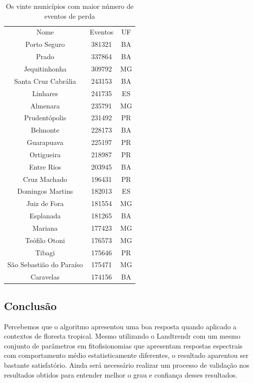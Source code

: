 \begin{table}[H]
    \centering
    \begin{tabular}{|c | c | c|}
    \hline
                            Nome & Eventos & UF \\
                Porto Seguro & 381321 & BA \\ 
                       Prado & 337864 & BA \\
                Jequitinhonha & 309792 & MG \\
        Santa Cruz Cabrália & 243153 & BA \\
                    Linhares & 241735 & ES \\
                      Almenara & 235791 & MG \\
              Prudentópolis & 231492 & PR \\
                    Belmonte & 228173 & BA \\
                  Guarapuava & 225197 & PR \\
                  Ortigueira & 218987 & PR \\
                  Entre Rios & 203945 & BA \\
                   Cruz Machado & 196431 & PR \\
            Domingos Martins & 182013 & ES \\
                 Juiz de Fora & 181554 & MG \\
                   Esplanada & 181265 & BA \\
                      Mariana & 177423 & MG \\
               Teófilo Otoni & 176573 & MG \\
                      Tibagi & 175646 & PR \\
  São Sebastião do Paraíso & 175471 & MG \\
                   Caravelas & 174156 & BA \\
    \hline
    \end{tabular}
    \caption{Os vinte municípios com maior número de eventos de perda}
    \label{tab:mun_gain}
\end{table}




\subsection{Conclusão}

\hspace{13pt} Percebemos que o algoritmo apresentou uma boa resposta quando aplicado a contextos de floresta tropical. Mesmo utilizando o Landtrendr com um mesmo conjunto de parâmetros em fitofisionomias que apresentam respostas espectrais com comportamento médio estatisticamente diferentes, o resultado aparentou ser bastante satisfatório. Ainda será necessário realizar um processo de validação nos resultados obtidos para entender melhor o grau e confiança desses resultados.

